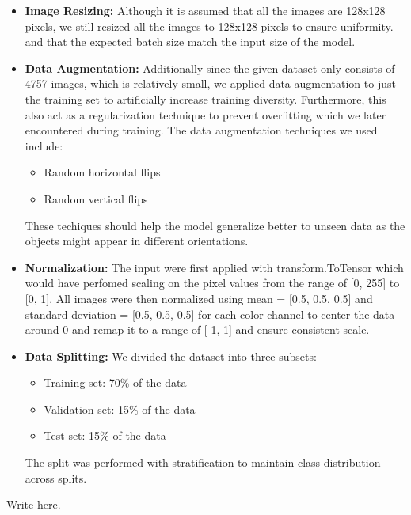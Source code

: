 \documentclass[10pt]{article}
\begin{document}
\begin{itemize}
    \item \textbf{Image Resizing:} Although it is assumed that all the images are 128x128 pixels, we still resized all the images to 128x128 pixels to ensure uniformity.
    and that the expected batch size match the input size of the model.
    
    \item \textbf{Data Augmentation:} Additionally since the given dataset only consists of 4757 images, which is relatively small, we applied data augmentation to just the 
    training set to artificially increase training diversity. Furthermore, this also act as a regularization technique to prevent 
    overfitting which we later encountered during training. The data augmentation techniques we used include:
    \begin{itemize}
        \item Random horizontal flips
        \item Random vertical flips
    \end{itemize}
    These techiques should help the model generalize better to unseen data as the objects might appear in different orientations.
    \item \textbf{Normalization:} The input were first applied with transform.ToTensor which would have perfomed scaling on the pixel values from the range of [0, 255] to [0, 1]. 
    All images were then normalized using mean = [0.5, 0.5, 0.5] and standard deviation = [0.5, 0.5, 0.5] for each color channel to center the data around 0 and remap it to a range of 
    [-1, 1] and ensure consistent scale.
    
    \item \textbf{Data Splitting:} We divided the dataset into three subsets:
    \begin{itemize}
        \item Training set: 70\% of the data
        \item Validation set: 15\% of the data
        \item Test set: 15\% of the data
    \end{itemize}
    The split was performed with stratification to maintain class distribution across splits.
\end{itemize}


Write here. 





\end{document}
